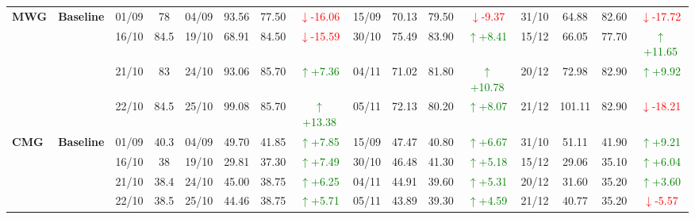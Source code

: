 {\begin{longtable}{llcc|cccc|cccc|cccc}
\multirow{4}{*}{\textbf{MWG}}
& \textbf{Baseline}
& 01/09 & 78 & 04/09 & 93.56 & 77.50 & \textcolor{red}{\(\downarrow\)-16.06} & 15/09 & 70.13 & 79.50 & \textcolor{red}{\(\downarrow\)-9.37} & 31/10 & 64.88 & 82.60 & \textcolor{red}{\(\downarrow\)-17.72} \\
& & 16/10 & 84.5 & 19/10 & 68.91 & 84.50 & \textcolor{red}{\(\downarrow\)-15.59} & 30/10 & 75.49 & 83.90 & \textcolor{green}{\(\uparrow\)+8.41} & 15/12 & 66.05 & 77.70 & \textcolor{green}{\(\uparrow\)+11.65} \\
& & 21/10 & 83 & 24/10 & 93.06 & 85.70 & \textcolor{green}{\(\uparrow\)+7.36} & 04/11 & 71.02 & 81.80 & \textcolor{green}{\(\uparrow\)+10.78} & 20/12 & 72.98 & 82.90 & \textcolor{green}{\(\uparrow\)+9.92} \\
& & 22/10 & 84.5 & 25/10 & 99.08 & 85.70 & \textcolor{green}{\(\uparrow\)+13.38} & 05/11 & 72.13 & 80.20 & \textcolor{green}{\(\uparrow\)+8.07} & 21/12 & 101.11 & 82.90 & \textcolor{red}{\(\downarrow\)-18.21} \\
\midrule

\multirow{4}{*}{\textbf{CMG}}
& \textbf{Baseline}
& 01/09 & 40.3 & 04/09 & 49.70 & 41.85 & \textcolor{green}{\(\uparrow\)+7.85} & 15/09 & 47.47 & 40.80 & \textcolor{green}{\(\uparrow\)+6.67} & 31/10 & 51.11 & 41.90 & \textcolor{green}{\(\uparrow\)+9.21} \\
& & 16/10 & 38 & 19/10 & 29.81 & 37.30 & \textcolor{green}{\(\uparrow\)+7.49} & 30/10 & 46.48 & 41.30 & \textcolor{green}{\(\uparrow\)+5.18} & 15/12 & 29.06 & 35.10 & \textcolor{green}{\(\uparrow\)+6.04} \\
& & 21/10 & 38.4 & 24/10 & 45.00 & 38.75 & \textcolor{green}{\(\uparrow\)+6.25} & 04/11 & 44.91 & 39.60 & \textcolor{green}{\(\uparrow\)+5.31} & 20/12 & 31.60 & 35.20 & \textcolor{green}{\(\uparrow\)+3.60} \\
& & 22/10 & 38.5 & 25/10 & 44.46 & 38.75 & \textcolor{green}{\(\uparrow\)+5.71} & 05/11 & 43.89 & 39.30 & \textcolor{green}{\(\uparrow\)+4.59} & 21/12 & 40.77 & 35.20 & \textcolor{red}{\(\downarrow\)-5.57} \\
\midrule


\end{longtable}}
